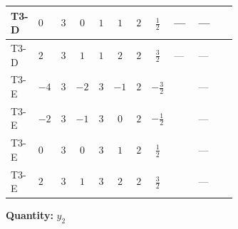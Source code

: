 \documentclass[8pt]{article}
\begin{document}
\begin{landscape}
\begin{longtable}{@{}llcccccc >{\raggedright\arraybackslash}p{0.21\linewidth} >{\raggedright\arraybackslash}p{0.21\linewidth} >{\raggedright\arraybackslash}p{0.21\linewidth}@{}}
\midrule
T3-D & $0$ & $3$ & $0$ & $1$ & $1$ & $2$ & $\frac{1}{2}$ & --- & --- & \scriptsize\adjustbox{max width=\linewidth}{$\begin{gathered} -\frac{9}{2} {g_2}^2 \left({y_2}\right)_{ij}\end{gathered}$} \\
\midrule
T3-D & $2$ & $3$ & $1$ & $1$ & $2$ & $2$ & $\frac{3}{2}$ & --- & --- & \scriptsize\adjustbox{max width=\linewidth}{$\begin{gathered} -\frac{9}{2} {g_2}^2 \left({y_2}\right)_{ij}\end{gathered}$} \\
\midrule
T3-E & $-4$ & $3$ & $-2$ & $3$ & $-1$ & $2$ & $-\frac{3}{2}$ & \scriptsize\adjustbox{max width=\linewidth}{$\begin{gathered} T_{\nu}^{(2)} \left({y_2}\right)_{ij}\end{gathered}$} & --- & \scriptsize\adjustbox{max width=\linewidth}{$\begin{gathered} -\frac{9}{2} {g_2}^2 \left({y_2}\right)_{ij}\end{gathered}$} \\
\midrule
T3-E & $-2$ & $3$ & $-1$ & $3$ & $0$ & $2$ & $-\frac{1}{2}$ & \scriptsize\adjustbox{max width=\linewidth}{$\begin{gathered} T_{\nu}^{(2)} \left({y_2}\right)_{ij}\end{gathered}$} & --- & \scriptsize\adjustbox{max width=\linewidth}{$\begin{gathered} -\frac{9}{2} {g_2}^2 \left({y_2}\right)_{ij}\end{gathered}$} \\
\midrule
T3-E & $0$ & $3$ & $0$ & $3$ & $1$ & $2$ & $\frac{1}{2}$ & \scriptsize\adjustbox{max width=\linewidth}{$\begin{gathered} T_{\nu}^{(2)} \left({y_2}\right)_{ij}\end{gathered}$} & --- & \scriptsize\adjustbox{max width=\linewidth}{$\begin{gathered} -\frac{9}{2} {g_2}^2 \left({y_2}\right)_{ij}\end{gathered}$} \\
\midrule
T3-E & $2$ & $3$ & $1$ & $3$ & $2$ & $2$ & $\frac{3}{2}$ & \scriptsize\adjustbox{max width=\linewidth}{$\begin{gathered} T_{\nu}^{(2)} \left({y_2}\right)_{ij}\end{gathered}$} & --- & \scriptsize\adjustbox{max width=\linewidth}{$\begin{gathered} -\frac{9}{2} {g_2}^2 \left({y_2}\right)_{ij}\end{gathered}$} \\
\midrule
\bottomrule
\end{longtable}
\clearpage
\noindent\textbf{Quantity: }$y_2$\par\smallskip

\end{landscape}
\end{document}
